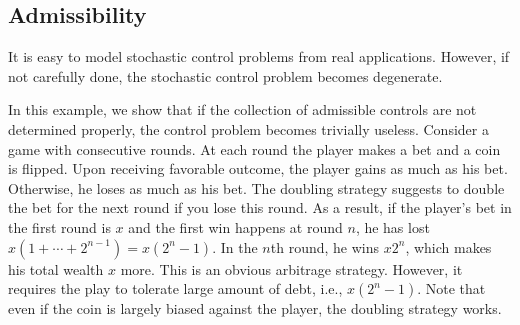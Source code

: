 \documentclass[11pt]{book}
\newcommand{\dd}{\text{\normalfont d}}
\newcommand{\dX}{\text{\normalfont d}X}
\newcommand{\dW}{\text{\normalfont d}W}
\begin{document}
\subsection{Admissibility}
It is easy to model stochastic control problems from real applications.  However, if not carefully done, the stochastic control problem becomes degenerate.

\begin{ex}\label{eg:admissibility_paradox}
In this example, we show that if the collection of admissible controls are not determined properly, the control problem becomes trivially useless. Consider a game with consecutive rounds. At each round the player makes a bet and a coin is flipped. Upon receiving favorable outcome, the player gains as much as his bet. Otherwise, he loses as much as his bet. 
The doubling strategy suggests to double the bet for the next round if you lose this round. As a result, if the player's bet in the first round is $x$ and the first win happens at round $n$, he has lost $x(1+\cdots+2^{n-1})=x(2^{n}-1)$. In the $n$th round, he wins $x2^n$, which makes his total wealth $x$ more. This is an obvious arbitrage strategy. However, it requires the play to tolerate large amount of debt, i.e., $x(2^{n}-1)$. Note that even if the coin is largely biased against the player, the doubling strategy works. 

 


\end{ex}
\end{document}
